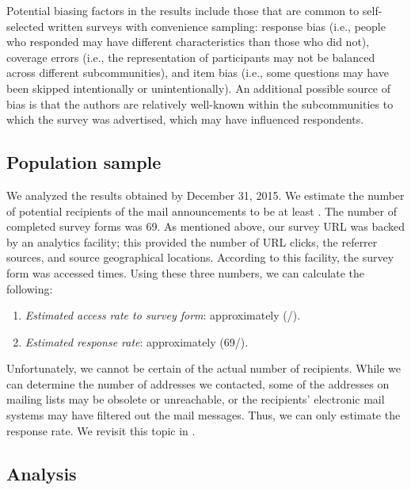 \documentclass{casicswhitepaper}
\newcommand{\totalRespondents}{69\xspace}
\begin{document}
Potential biasing factors in the results include those that are common to self-selected written surveys with convenience sampling: response bias (i.e., people who responded may have different characteristics than those who did not), coverage errors (i.e., the representation of participants may not be balanced across different subcommunities), and item bias (i.e., some questions may have been skipped intentionally or unintentionally).  An additional possible source of bias is that the authors are relatively well-known within the subcommunities to which the survey was advertised, which may have influenced respondents.  


\subsection{Population sample}
\label{population-sample}

We analyzed the results obtained by December 31, 2015.  We estimate the number of potential recipients of the mail announcements to be at least \totalPotentialRecipients.  The number of completed survey forms was \totalRespondents.  As mentioned above, our survey URL was backed by an analytics facility; this provided the number of URL clicks, the referrer sources, and source geographical locations.  According to this facility, the survey form was accessed \totalClicks times.  Using these three numbers, we can calculate the following:

\begin{enumerate}[itemsep=-0.5ex]

\item \emph{Estimated access rate to survey form}: approximately \accessRate  (\totalClicks/\totalPotentialRecipients).

\item \emph{Estimated response rate}: approximately \populationResponseRate (\totalRespondents/\totalPotentialRecipients).

\end{enumerate}

Unfortunately, we cannot be certain of the actual number of recipients.  While we can determine the number of addresses we contacted, some of the addresses on mailing lists may be obsolete or unreachable, or the recipients' electronic mail systems may have filtered out the mail messages.  Thus, we can only estimate the response rate.  We revisit this topic in .


\subsection{Analysis}
\end{document}
